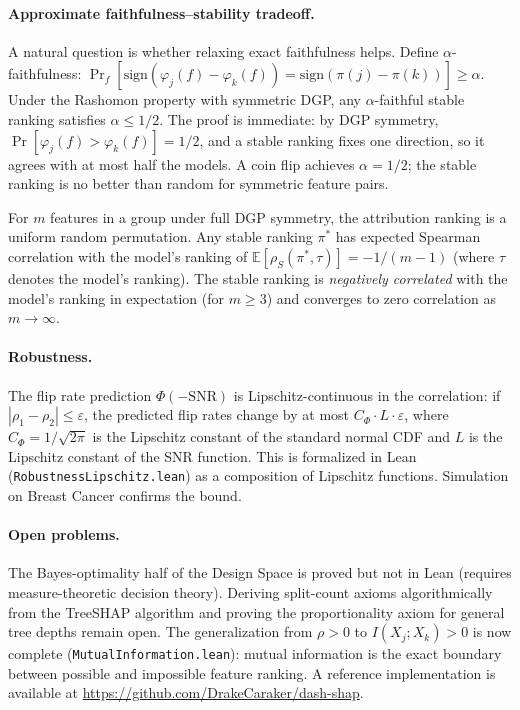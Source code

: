 \documentclass{jmlr}
\newcommand{\E}{\mathbb{E}}
\begin{document}
\paragraph{Approximate faithfulness--stability tradeoff.}
A natural question is whether relaxing exact faithfulness helps. Define $\alpha$-faithfulness: $\Pr_f[\text{sign}(\varphi_j(f) - \varphi_k(f)) = \text{sign}(\pi(j) - \pi(k))] \geq \alpha$. Under the Rashomon property with symmetric DGP, any $\alpha$-faithful stable ranking satisfies $\alpha \leq 1/2$. The proof is immediate: by DGP symmetry, $\Pr[\varphi_j(f) > \varphi_k(f)] = 1/2$, and a stable ranking fixes one direction, so it agrees with at most half the models. A coin flip achieves $\alpha = 1/2$; the stable ranking is no better than random for symmetric feature pairs.

For $m$ features in a group under full DGP symmetry, the attribution ranking is a uniform random permutation. Any stable ranking $\pi^*$ has expected Spearman correlation with the model's ranking of $\E[\rho_S(\pi^*, \tau)] = -1/(m-1)$ (where $\tau$ denotes the model's ranking). The stable ranking is \emph{negatively correlated} with the model's ranking in expectation (for $m \geq 3$) and converges to zero correlation as $m \to \infty$.

\paragraph{Robustness.}
The flip rate prediction $\Phi(-\text{SNR})$ is Lipschitz-continuous in the correlation: if $|\rho_1 - \rho_2| \leq \varepsilon$, the predicted flip rates change by at most $C_\Phi \cdot L \cdot \varepsilon$, where $C_\Phi = 1/\sqrt{2\pi}$ is the Lipschitz constant of the standard normal CDF and $L$ is the Lipschitz constant of the SNR function. This is formalized in Lean (\texttt{RobustnessLipschitz.lean}) as a composition of Lipschitz functions. Simulation on Breast Cancer confirms the bound.

\paragraph{Open problems.}
The Bayes-optimality half of the Design Space is proved but not in Lean (requires measure-theoretic decision theory). Deriving split-count axioms algorithmically from the TreeSHAP algorithm and proving the proportionality axiom for general tree depths remain open. The generalization from $\rho > 0$ to $I(X_j; X_k) > 0$ is now complete (\texttt{MutualInformation.lean}): mutual information is the exact boundary between possible and impossible feature ranking. A reference implementation is available at \url{https://github.com/DrakeCaraker/dash-shap}.
\end{document}
